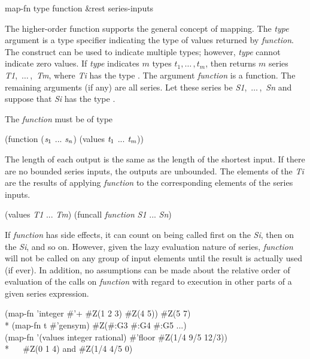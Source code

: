 \begin{defun}[Function]
map-fn type function &rest series-inputs

The higher-order function  supports the general concept of
mapping.   The \emph{type} argument is a type specifier indicating
the type of values returned by \emph{function}.  The 
construct can be used to indicate multiple types; however, \emph{type}
cannot indicate zero values.  If \emph{type} indicates $m$ types
$t_1, \ldots\,, t_m$,
then  returns $m$ series
\emph{T1},~$\ldots\,$,~\emph{Tm}, where \emph{Ti} has the
type .
The argument
\emph{function} is a function.   The remaining arguments (if any) are all
series.  Let these series be \emph{S1},~$\ldots\,$,~\emph{Sn} and suppose that
\emph{Si} has the type .

The \emph{function} must be of type
\begin{lisp}
(function ($\emph{s}_1$ ... $\emph{s}_{\hbox{\scriptsize\it n}}$) (values $\emph{t}_1$ ... $\emph{t}_{\hbox{\scriptsize\it m}}$))
\end{lisp}

The length of each output is the same as the length of the shortest input.
If there are no bounded series inputs, the outputs are unbounded.
The elements of the \emph{Ti} are the results of applying \emph{function} to
the corresponding elements of the series inputs.
\begin{lisp}
(values \emph{T1} ... \emph{Tm}) {\EQ} (funcall \emph{function} \emph{S1} ... \emph{Sn})
\end{lisp}

If \emph{function} has side effects, it can count on being called first on
the \emph{Si}, then on the \emph{Si}, and so on.  However, given
the lazy evaluation nature of series, \emph{function} will not be called on
any group of input elements until the result is actually used (if ever).
In addition, no assumptions can be made about the relative order of
evaluation of the calls on \emph{function} with regard to execution in other parts of a
given series expression.
\begin{lisp}
(map-fn 'integer \#'+ \#Z(1 2 3) \#Z(4 5)) {\EV} \#Z(5 7) \\*
(map-fn t \#'gensym) {\EV} \#Z(\#:G3 \#:G4 \#:G5 ...) \\
(map-fn '(values integer rational) \#'floor \#Z(1/4 9/5 12/3)) \\*
~~{\EV} \#Z(0 1 4) {\rm and} \#Z(1/4 4/5 0)
\end{lisp}


\end{defun}

